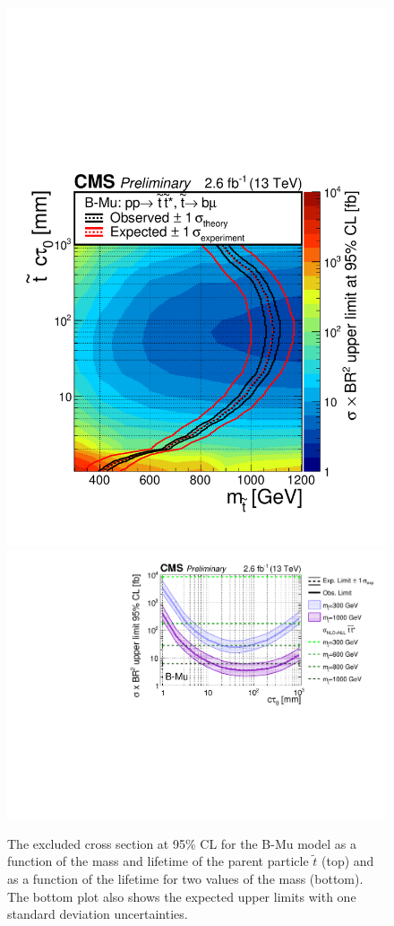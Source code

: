 \begin{figure}[tb]
\begin{center}
\includegraphics[width=.75\textwidth]{figures/pas//RESULT/UNBLINDED_LIMITS/B-Mu2D.pdf}
\includegraphics[width=.85\textwidth]{figures/pas//RESULT/UNBLINDED_LIMITS/B-Mu.pdf}
\caption{ The excluded cross section at 95\% CL for the B-Mu model as
  a function of the mass and lifetime of the parent particle
  $\tilde{t}$ (top) and as a function of the lifetime for two values
  of the mass (bottom).  The bottom plot also shows the expected upper
  limits with one standard deviation
  uncertainties.\label{fig:dsusy_limit_mu}}
\end{center}
\end{figure}
